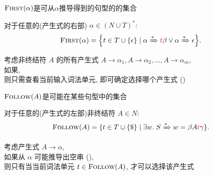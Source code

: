 \begin{frame}{}
  \begin{center}

    \vspace{0.60cm}
    $\textsc{First}(\alpha)$是可从$\alpha$推导得到的句型的的集合
    \begin{definition}
      对于任意的(产生式的右部) $\alpha \in (N \cup T)^{\ast}:$
      \[
        \textsc{First}(\alpha) = \Big\{t \in T \cup \{\epsilon\}
          \mid \alpha \xRightarrow[]{\ast} \textcolor{red}{t}\beta \lor \alpha \xRightarrow[]{\ast} \epsilon \Big\}.
      \]
    \end{definition}

    \pause
    \vspace{0.60cm}
    考虑非终结符 $A$ 的所有产生式
    $A \to \alpha_{1}, A \to \alpha_{2}, \dots, A \to \alpha_{m}$, \\[4pt]
    如果, \\[4pt]
    则只需查看当前输入词法单元, 即可确定选择哪个产生式 ()
  \end{center}
\end{frame}

\begin{frame}{}
  \begin{center}

    \vspace{0.60cm}
    $\follow(A)$是可能在某些句型中的集合
    \begin{definition}[$\follow(A)$集合]
        对于任意的(产生式的左部)非终结符 $A \in N:$
        \[
          \textsc{Follow}(A) = \{t \in T \cup \{\$\}
            \mid \exists w.\; S \xRightarrow[]{\ast} w = \beta A\textcolor{red}{t} \gamma\}.
        \]
    \end{definition}

    \pause
    \vspace{0.60cm}
    考虑产生式 $A \to \alpha$, \\[4pt]
    如果从 $\alpha$ 可能推导出空串 (\red{$\alpha \dstar \epsilon$}), \\[4pt]
    则只有当当前词法单元 $t \in \textsc{Follow}(A)$, 才可以选择该产生式
  \end{center}
\end{frame}

